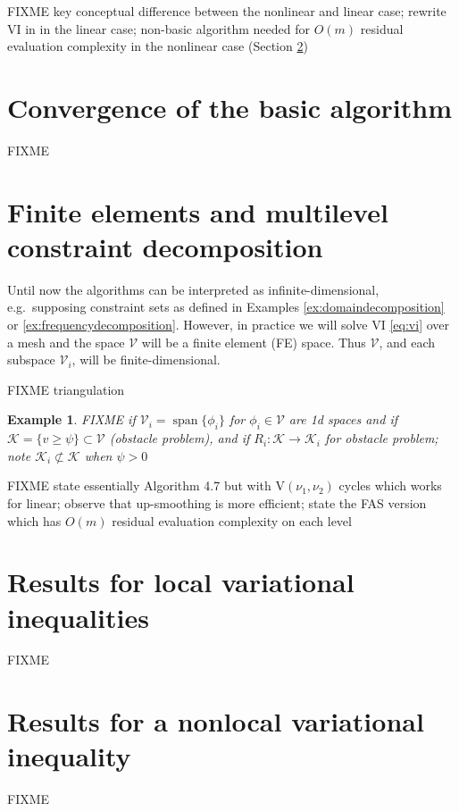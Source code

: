 \documentclass[letterpaper,final,12pt,reqno]{amsart}
\theoremstyle{cstyle}
\theoremstyle{dstyle}
\newtheorem{example}[theorem]{Example}
\numberwithin{equation}{section}
\numberwithin{figure}{section}
\numberwithin{table}{section}
\numberwithin{theorem}{section}
\newcommand{\cK}{\mathcal{K}}
\newcommand{\cV}{\mathcal{V}}
\newcommand{\Span}{\operatorname{span}}
\begin{document}
FIXME key conceptual difference between the nonlinear and linear case; rewrite VI in  in the linear case; non-basic algorithm needed for $O(m)$ residual evaluation complexity in the nonlinear case (Section \ref{sec:multilevel})


\section{Convergence of the basic algorithm} \label{sec:convergence}

FIXME


\section{Finite elements and multilevel constraint decomposition} \label{sec:multilevel}

Until now the algorithms can be interpreted as infinite-dimensional, e.g.~supposing constraint sets as defined in Examples \ref{ex:domaindecomposition} or \ref{ex:frequencydecomposition}.  However, in practice we will solve VI \eqref{eq:vi} over a mesh and the space $\cV$ will be a finite element (FE) space.  Thus $\cV$, and each subspace $\cV_i$, will be finite-dimensional.

FIXME triangulation

\begin{example}  FIXME if $\cV_i=\Span\{\phi_i\}$ for $\phi_i\in\cV$ are 1d spaces and if $\cK = \{v \ge \psi\} \subset \cV$ (obstacle problem), and if $R_i : \cK \to \cK_i$ for obstacle problem; note $\cK_i \not\subset \cK$ when $\psi>0$
\end{example}

FIXME state essentially Algorithm 4.7 \cite{GraeserKornhuber2009} but with $\text{V}(\nu_1,\nu_2)$ cycles which works for linear; observe that up-smoothing is more efficient; state the FAS version which has $O(m)$ residual evaluation complexity on each level


\section{Results for local variational inequalities} \label{sec:resultslocal}

FIXME


\section{Results for a nonlocal variational inequality} \label{sec:resultsnonlocal}

FIXME


\small


\end{document}

